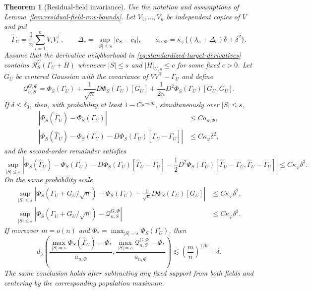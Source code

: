 \documentclass[a4paper,11pt,english]{article}
\newtheorem{theorem}{Theorem}[section]
\begin{document}
\begin{theorem}[Residual-field invariance]
\label{thm:residual-field-invariance}
Use the notation and assumptions of
Lemma~\ref{lem:residual-field-row-bounds}.  Let
$V_1,\ldots,V_n$ be independent copies of $V$ and put
\[
 \hat\Gamma_U=\frac1n\sum_{i=1}^nV_iV_i^\top,
 \qquad
 \Delta_c=\sup_{|S|\le s}|c_S-c_0|,
 \qquad
 a_{n,\Phi}=\kappa_\varphi
 \{(\lambda_s+\Delta_c)\delta+\delta^2\}.
\]
Assume that the derivative neighborhood in
\eqref{eq:standardized-target-derivatives} contains
$\mathcal R_S^U(\Gamma_U+H)$ whenever $|S|\le s$ and
$|H|_{U,s}\le c$ for some fixed $c>0$.  Let $G_U$ be centered Gaussian
with the covariance of $VV^\top-\Gamma_U$ and define
\[
 \mathcal Q_{n,S}^{G,\Phi}
 =\Phi_S(\Gamma_U)+\frac1{\sqrt n}D\Phi_S(\Gamma_U)[G_U]
 +\frac1{2n}D^2\Phi_S(\Gamma_U)[G_U,G_U].
\]
If $\delta\le\delta_0$, then, with probability at least $1-Ce^{-cm}$,
simultaneously over $|S|\le s$,
\begin{align}
 |\Phi_S(\hat\Gamma_U)-\Phi_S(\Gamma_U)|
 &\le Ca_{n,\Phi},
 \label{eq:generic-uniform-deviation}\\
 |\Phi_S(\hat\Gamma_U)-\Phi_S(\Gamma_U)
 -D\Phi_S(\Gamma_U)[\hat\Gamma_U-\Gamma_U]|
 &\le C\kappa_\varphi\delta^2,
 \label{eq:generic-first-order-expansion}
\end{align}
and the second-order remainder satisfies
\begin{equation}\label{eq:generic-critical-expansion}
 \sup_{|S|\le s}\left|
 \Phi_S(\hat\Gamma_U)-\Phi_S(\Gamma_U)
 -D\Phi_S(\Gamma_U)[\hat\Gamma_U-\Gamma_U]
 -\frac12D^2\Phi_S(\Gamma_U)
 [\hat\Gamma_U-\Gamma_U,\hat\Gamma_U-\Gamma_U]
 \right|\le C\kappa_\varphi\delta^3.
\end{equation}
On the same probability scale,
\begin{align}
 \sup_{|S|\le s}\left|
 \Phi_S(\Gamma_U+G_U/\sqrt n)-\Phi_S(\Gamma_U)
 -\frac1{\sqrt n}D\Phi_S(\Gamma_U)[G_U]
 \right|
 &\le C\kappa_\varphi\delta^2,
 \label{eq:generic-gaussian-first-order}\\
 \sup_{|S|\le s}\left|
 \Phi_S(\Gamma_U+G_U/\sqrt n)-\mathcal Q_{n,S}^{G,\Phi}
 \right|
 &\le C\kappa_\varphi\delta^3.
 \label{eq:generic-gaussian-second-order}
\end{align}
If moreover $m=o(n)$ and
$\Phi_*=\max_{|S|=s}\Phi_S(\Gamma_U)$, then
\begin{equation}\label{eq:generic-matched-approximation}
 d_3\left(
 \frac{\max_{|S|=s}\Phi_S(\hat\Gamma_U)-\Phi_*}{a_{n,\Phi}},
 \frac{\max_{|S|=s}\mathcal Q_{n,S}^{G,\Phi}-\Phi_*}{a_{n,\Phi}}
 \right)
 \lesssim\left(\frac mn\right)^{1/6}+\delta.
\end{equation}
The same conclusion holds after subtracting any fixed support from both
fields and centering by the corresponding population maximum.
\end{theorem}
\end{document}

